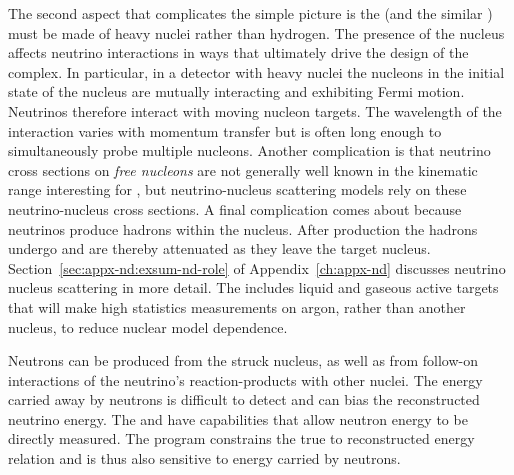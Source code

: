 The second aspect that complicates the simple picture is the  (and the similar ) must be made of heavy nuclei rather than hydrogen. %
The presence of the nucleus affects %
neutrino interactions in ways that ultimately drive the design of the   complex. In particular, in a detector with heavy nuclei the nucleons in the initial state of the nucleus are mutually interacting and exhibiting Fermi motion. Neutrinos therefore interact with moving nucleon targets. The wavelength of the interaction varies with momentum transfer but is often long enough to simultaneously probe multiple nucleons. Another complication is that neutrino cross sections on {\em free nucleons} are not generally well known in the kinematic range interesting for , but neutrino-nucleus scattering models rely on these neutrino-nucleus cross sections. A final complication comes about because neutrinos produce hadrons within the nucleus. After production the hadrons undergo  and are thereby attenuated as they leave the target nucleus. Section~\ref{sec:appx-nd:exsum-nd-role} of Appendix~\ref{ch:appx-nd} discusses neutrino nucleus scattering in more detail. The   includes liquid and gaseous active targets that will make high statistics measurements on argon, rather than another nucleus, to reduce nuclear model dependence. 


Neutrons can be produced from the struck nucleus, as well as from follow-on interactions of the neutrino's reaction-products with other nuclei. The energy carried away by neutrons is difficult to detect and can bias the reconstructed neutrino energy. The  and  have capabilities that allow neutron energy to be directly measured. The  program constrains the true to reconstructed energy relation and is thus also sensitive to energy carried by neutrons.

